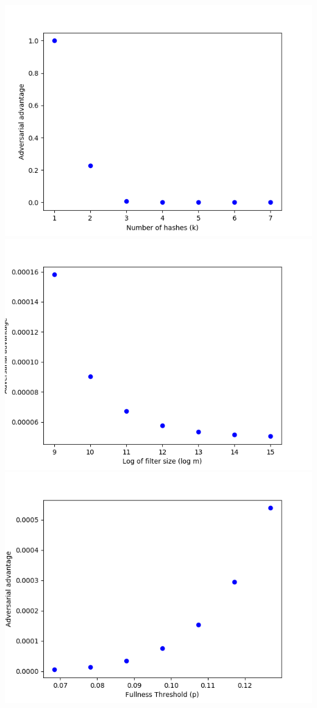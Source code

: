 \includegraphics[scale=0.5]{Ct_Figure_1}
\includegraphics[scale=0.5]{Ct_Figure_2}
\includegraphics[scale=0.5]{Ct_Figure_3}
